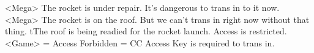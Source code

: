 <Mega> The rocket is under repair. It's dangerous to trans in to it now. 
<Mega> The rocket is on the roof. But we can't trans in right now without that thing. 
tThe roof is being readied for the rocket launch. Access is restricted. 
<Game> = Access Forbidden = CC Access Key is required to trans in. 
